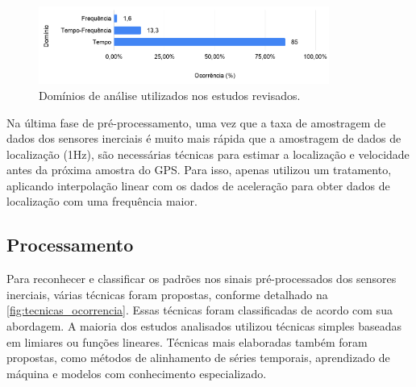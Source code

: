 \begin{figure}[h!]
  \centering
  \caption{Domínios de análise utilizados nos estudos revisados.}
   \label{fig:dominios_analise_ocorrencia}
   \includegraphics[width=0.85\textwidth]{figuras/fig_18.png}
\end{figure}

Na última fase de pré-processamento, uma vez que a taxa de amostragem de dados dos sensores inerciais é muito mais rápida que a amostragem de dados de localização (1Hz), são necessárias técnicas para estimar a localização e velocidade antes da próxima amostra do GPS. Para isso, apenas \cite{Li2018} utilizou um tratamento, aplicando interpolação linear com os dados de aceleração para obter dados de localização com uma frequência maior. 

\subsection{Processamento}

Para reconhecer e classificar os padrões nos sinais pré-processados dos sensores inerciais, várias técnicas foram propostas, conforme detalhado na \autoref{fig:tecnicas_ocorrencia}. Essas técnicas foram classificadas de acordo com sua abordagem. A maioria dos estudos analisados utilizou técnicas simples baseadas em limiares ou funções lineares. Técnicas mais elaboradas também foram propostas, como métodos de alinhamento de séries temporais, aprendizado de máquina e modelos com conhecimento especializado.

